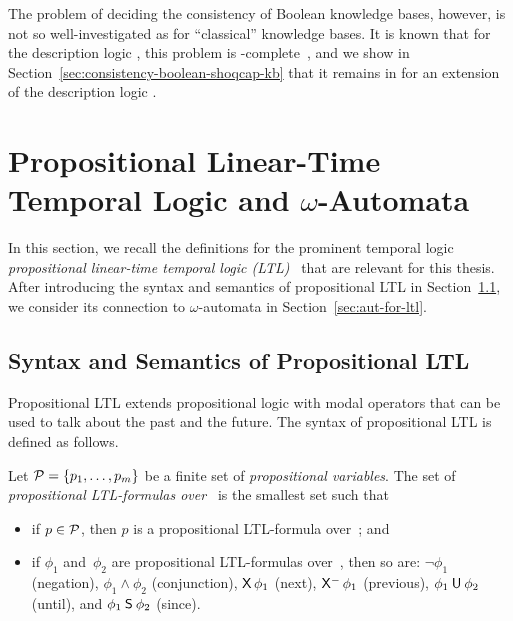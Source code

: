 The problem of deciding the consistency of Boolean knowledge bases, however, is
not so well-investigated as for \enquote{classical} knowledge bases.  It is
known that for the description logic \ALC, this problem is
\ExpTime-complete~\cite{GKW+-03}, and we show in
Section~\ref{sec:consistency-boolean-shoqcap-kb} that it remains in \ExpTime for
an extension of the description logic \SHOQ.


\section{Propositional Linear-Time Temporal Logic and \texorpdfstring{$\omega$}{Omega}-Automata}\label{sec:ltl-automata}

In this section, we recall the definitions for the prominent temporal logic
\emph{propositional linear-time temporal logic (LTL)}~\cite{Pnu-FOCS77} that are
relevant for this thesis.  After introducing the syntax and semantics of
propositional LTL in Section~\ref{sec:ltl}, we consider its connection to
$\omega$-automata in Section~\ref{sec:aut-for-ltl}.


\subsection{Syntax and Semantics of Propositional LTL}\label{sec:ltl}

Propositional LTL extends propositional logic with modal operators that can be
used to talk about the past and the future.
%
The syntax of propositional LTL is defined as follows.

\begin{definition}\label{def:syntax-ltl}
    Let $\mathcal{P}=\{p_1,\dots,p_m\}$ be a finite set of \emph{propositional
    variables}.  The set of \emph{propositional LTL-formulas over~\Pmc} is the
    smallest set such that
    \begin{itemize}
        \item if $p\in\mathcal{P}$, then $p$ is a propositional LTL-formula over~\Pmc;
            and
        \item if $\phi_1$ and~$\phi_2$ are propositional LTL-formulas over~\Pmc,
            then so are: $\lnot\phi_1$ (negation), $\phi_1\land\phi_2$
            (conjunction), $\operatorname{\mathsf{X}}\phi_1$ (next), $\Previous\phi_1$ (previous),
            $\phi_1\mathbin{\mathsf{U}}\phi_2$ (until), and $\phi_1\mathbin{\mathsf{S}}\phi_2$ (since).
    \end{itemize}
\end{definition}

